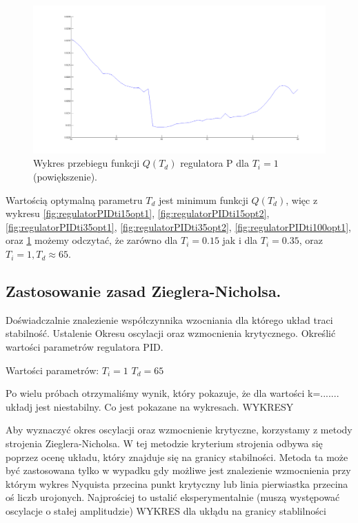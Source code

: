 \documentclass[a4paper,10pt]{article}
\begin{document}
\begin{figure}[!h]
    \centering
	\includegraphics[width=130mm]{CW2-regulatorPID-ti100-opt2.png}
	\caption{Wykres przebiegu funkcji $Q(T_{d})$ regulatora P dla $T_{i}=1$ (powiększenie).}
    \label{fig:regulatorPIDti100opt2}
\end{figure}
\newpage Wartością optymalną parametru $T_{d}$ jest minimum funkcji $Q(T_{d})$, więc z wykresu \ref{fig:regulatorPIDti15opt1}, \ref{fig:regulatorPIDti15opt2}, \ref{fig:regulatorPIDti35opt1}, \ref{fig:regulatorPIDti35opt2}, \ref{fig:regulatorPIDti100opt1}, oraz \ref{fig:regulatorPIDti100opt2} możemy odczytać, że zarówno dla $T_{i}=0.15$ jak i dla $T_{i}=0.35$, oraz $T_{i}=1, T_{d} \approx 65$.

\subsection{Zastosowanie zasad Zieglera-Nicholsa.}\label{sec:zad3}
Doświadczalnie znalezienie współczynnika wzocniania dla którego układ traci stabilność.
Ustalenie Okresu oscylacji oraz wzmocnienia krytycznego.
Określić wartości parametrów regulatora PID.

Wartości parametrów:
$T_{i}=1$
$T_{d}=65$

Po wielu próbach otrzymaliśmy wynik, który  pokazuje, że dla wartości k=....... układj jest niestabilny. Co jest pokazane na wykresach.
WYKRESY

Aby wyznaczyć okres oscylacji oraz wzmocnienie krytyczne, korzystamy z metody  strojenia Zieglera-Nicholsa. W tej metodzie kryterium strojenia odbywa się poprzez ocenę układu, który znajduje się na granicy stabilności.
Metoda ta może być zastosowana tylko w wypadku gdy możliwe jest znalezienie wzmocnienia przy którym wykres Nyquista przecina punkt krytyczny lub linia pierwiastka przecina oś liczb urojonych. Najprościej to ustalić eksperymentalnie (muszą występować oscylacje o stałej amplitudzie)
WYKRES dla ukłądu na granicy stablilności
\end{document}
